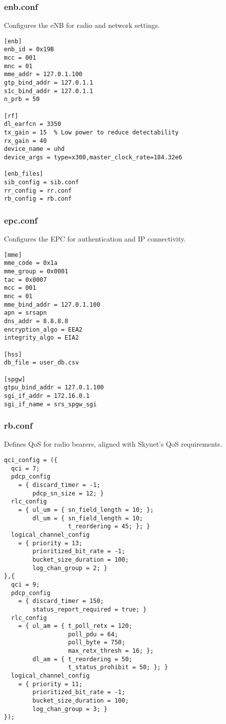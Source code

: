 \documentclass{article}
\begin{document}
\subsubsection{enb.conf}
Configures the eNB for radio and network settings.
\begin{lstlisting}
[enb]
enb_id = 0x19B
mcc = 001
mnc = 01
mme_addr = 127.0.1.100
gtp_bind_addr = 127.0.1.1
s1c_bind_addr = 127.0.1.1
n_prb = 50

[rf]
dl_earfcn = 3350
tx_gain = 15  % Low power to reduce detectability
rx_gain = 40
device_name = uhd
device_args = type=x300,master_clock_rate=184.32e6

[enb_files]
sib_config = sib.conf
rr_config = rr.conf
rb_config = rb.conf
\end{lstlisting}

\subsubsection{epc.conf}
Configures the EPC for authentication and IP connectivity.
\begin{lstlisting}
[mme]
mme_code = 0x1a
mme_group = 0x0001
tac = 0x0007
mcc = 001
mnc = 01
mme_bind_addr = 127.0.1.100
apn = srsapn
dns_addr = 8.8.8.8
encryption_algo = EEA2
integrity_algo = EIA2

[hss]
db_file = user_db.csv

[spgw]
gtpu_bind_addr = 127.0.1.100
sgi_if_addr = 172.16.0.1
sgi_if_name = srs_spgw_sgi
\end{lstlisting}

\subsubsection{rb.conf}
Defines QoS for radio bearers, aligned with Skynet’s QoS requirements.
\begin{lstlisting}
qci_config = ({
  qci = 7;
  pdcp_config
    = { discard_timer = -1;
        pdcp_sn_size = 12; }
  rlc_config
    = { ul_um = { sn_field_length = 10; };
        dl_um = { sn_field_length = 10;
                  t_reordering = 45; }; }
  logical_channel_config
    = { priority = 13;
        prioritized_bit_rate = -1;
        bucket_size_duration = 100;
        log_chan_group = 2; }
},{
  qci = 9;
  pdcp_config
    = { discard_timer = 150;
        status_report_required = true; }
  rlc_config
    = { ul_am = { t_poll_retx = 120;
                  poll_pdu = 64;
                  poll_byte = 750;
                  max_retx_thresh = 16; };
        dl_am = { t_reordering = 50;
                  t_status_prohibit = 50; }; }
  logical_channel_config
    = { priority = 11;
        prioritized_bit_rate = -1;
        bucket_size_duration = 100;
        log_chan_group = 3; }
});
\end{lstlisting}
\end{document}
